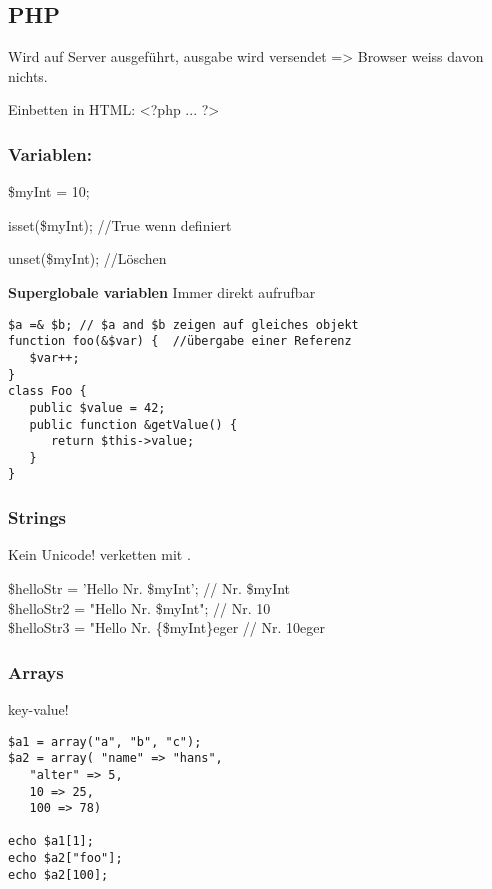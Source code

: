 \newpage
\subsection{PHP}
Wird auf Server ausgeführt, ausgabe wird versendet => Browser weiss davon nichts.

Einbetten in HTML: <?php ... ?>
\subsubsection{Variablen:}
\$myInt = 10;

isset(\$myInt); //True wenn definiert

unset(\$myInt); //Löschen

\textbf{Superglobale variablen}
Immer direkt aufrufbar 

 
\begin{verbatim}
$a =& $b; // $a and $b zeigen auf gleiches objekt
function foo(&$var) {  //übergabe einer Referenz
   $var++;
}
class Foo {
   public $value = 42;
   public function &getValue() {
      return $this->value;
   }
}
\end{verbatim}
\subsubsection{Strings}
Kein Unicode! verketten mit .

\$helloStr = 'Hello Nr. \$myInt';  // Nr. \$myInt\\
\$helloStr2 = "Hello Nr. \$myInt";  // Nr. 10\\
\$helloStr3 = "Hello Nr. \{\$myInt\}eger // Nr. 10eger \newpage
\subsubsection{Arrays}
key-value!\begin{verbatim}
$a1 = array("a", "b", "c");
$a2 = array( "name" => "hans",
   "alter" => 5,
   10 => 25,
   100 => 78)

echo $a1[1];
echo $a2["foo"];
echo $a2[100];
\end{verbatim}

